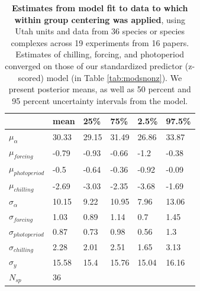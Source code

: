 \documentclass{article}
\begin{document}
\begin{footnotesize}
\begin{table}[ht]
\centering
\caption{\textbf{Estimates from model fit to data to which within group centering was applied}, using Utah units and data from 36 species or species complexes across 19 experiments from 16 papers. Estimates of chilling, forcing, and photoperiod  converged on those of our standardized predictor (z-scored) model (in Table \ref{tab:modsnonz}). We present posterior means, as well as 50 percent and 95 percent uncertainty intervals from the model.} 
\label{tab:wgc}
\begingroup\footnotesize
\begin{tabular}{|p{}|p{}p{}p{}p{}p{}|}
  \hline
 & mean & 25\% & 75\% & 2.5\% & 97.5\% \\ 
  \hline
$\mu_{\alpha}$ & 30.33 & 29.15 & 31.49 & 26.86 & 33.87 \\ 
  $\mu_{forcing}$ & -0.79 & -0.93 & -0.66 & -1.2 & -0.38 \\ 
  $\mu_{photoperiod}$ & -0.5 & -0.64 & -0.36 & -0.92 & -0.09 \\ 
  $\mu_{chilling}$ & -2.69 & -3.03 & -2.35 & -3.68 & -1.69 \\ 
  $\sigma_{\alpha}$ & 10.15 & 9.22 & 10.95 & 7.96 & 13.06 \\ 
  $\sigma_{forcing}$ & 1.03 & 0.89 & 1.14 & 0.7 & 1.45 \\ 
  $\sigma_{photoperiod}$ & 0.87 & 0.73 & 0.98 & 0.56 & 1.3 \\ 
  $\sigma_{chilling}$ & 2.28 & 2.01 & 2.51 & 1.65 & 3.13 \\ 
  $\sigma_{y}$ & 15.58 & 15.4 & 15.76 & 15.04 & 16.16 \\ 
   \hline
$N_{sp}$ & 36 &  &  &  &  \\ 
   \hline
\end{tabular}
\endgroup
\end{table}


\end{footnotesize}
\end{document}
